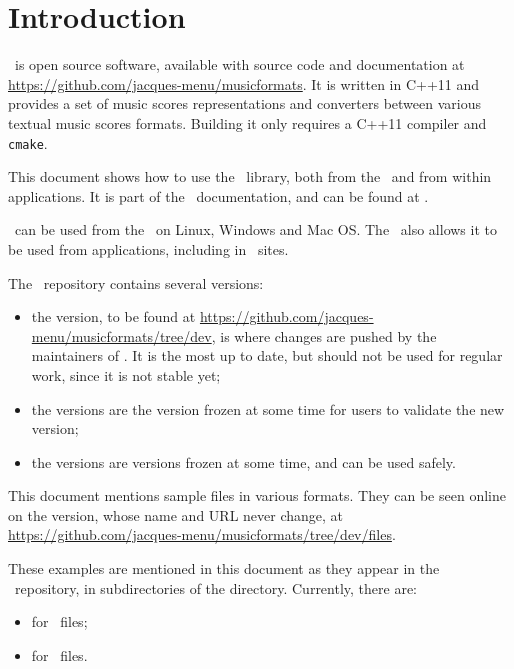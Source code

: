 
\chapter{Introduction}

\mf\ is open source software, available with source code and documentation at \url{https://github.com/jacques-menu/musicformats}. It is written in C++11 and provides a set of music scores representations and converters between various textual music scores formats. Building it only requires a C++11 compiler and {\tt cmake}.

This document shows how to use the \mf\ library, both from the \CLI\ and from within applications. It is part of the \mf\ documentation, and can be found at .

\mf\ can be used from the \CLI\ on Linux, Windows and Mac OS. The \API\ also allows it to be used from applications, including in \Web\ sites.

The \mf\ repository contains several versions:
\begin{itemize}
\item the  version, to be found at \url{https://github.com/jacques-menu/musicformats/tree/dev}, is where changes are pushed by the maintainers of \mf. It is the most up to date, but should not be used for regular work, since it is not stable yet;
\item the  versions are the  version frozen at some time for users to validate the new version;
\item the  versions are  versions frozen at some time, and can be used safely.
\end{itemize}

This document mentions sample files in various formats. They can be seen online on the  version, whose name and URL never change, at \url{https://github.com/jacques-menu/musicformats/tree/dev/files}.

These examples are mentioned in this document as they appear in the \mf\ repository, in subdirectories of the  directory. Currently, there are:
\begin{itemize}
\item {} for \mxml\ files;
\item {} for \msdlLang\ files.
\end{itemize}

